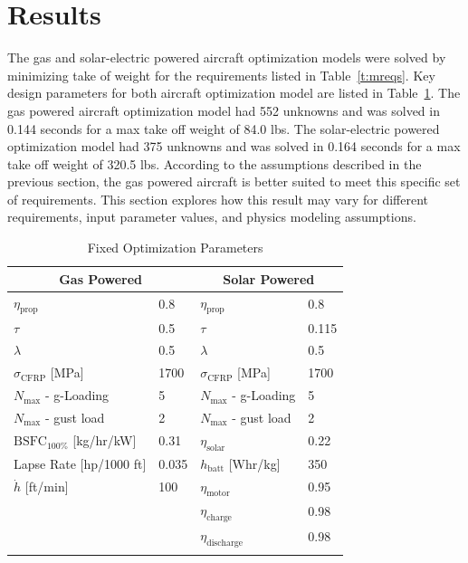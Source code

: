 \section{Results}

The gas and solar-electric powered aircraft optimization models were solved by minimizing take of weight for the requirements listed in Table~\ref{t:mreqs}. 
Key design parameters for both aircraft optimization model are listed in Table~\ref{t:gassolarparams}.
The gas powered aircraft optimization model had 552 unknowns and was solved in 0.144 seconds for a max take off weight of 84.0 lbs.  
The solar-electric powered optimization model had 375 unknowns and was solved in 0.164 seconds for a max take off weight of 320.5 lbs.
According to the assumptions described in the previous section, the gas powered aircraft is better suited to meet this specific set of requirements. 
This section explores how this result may vary for different requirements, input parameter values, and physics modeling assumptions. 

\begin{longtable}{llll}
\caption{Fixed Optimization Parameters} \\
\toprule
\toprule
\multicolumn{2}{c}{Gas Powered} & \multicolumn{2}{c}{Solar Powered}\\
\midrule
$\eta_{\text{prop}}$         & 0.8  & $\eta_{\text{prop}}$         & 0.8 \\
$\tau$                       & 0.5  & $\tau$                       & 0.115 \\
$\lambda$                    & 0.5  & $\lambda$                    & 0.5 \\
$\sigma_{\text{CFRP}}$ [MPa] & 1700 & $\sigma_{\text{CFRP}}$ [MPa] & 1700  \\
$N_{\text{max}}$ - g-Loading & 5    & $N_{\text{max}}$ - g-Loading & 5 \\
$N_{\text{max}}$ - gust load & 2    & $N_{\text{max}}$ - gust load & 2 \\
$\text{BSFC}_{100\%}$ [kg/hr/kW] & 0.31 & $\eta_{\text{solar}}$      & 0.22 \\
Lapse Rate [hp/1000 ft]      & 0.035 &  $h_{\text{batt}}$ [Whr/kg]   & 350 \\
$\dot{h}$ [ft/min]           & 100 & $\eta_{\text{motor}}$           & 0.95 \\ 
                             &     & $\eta_{\text{charge}}$          & 0.98 \\
                             &     & $\eta_{\text{discharge}}$       & 0.98 \\
\bottomrule
\label{t:gassolarparams}
 \end{longtable}

